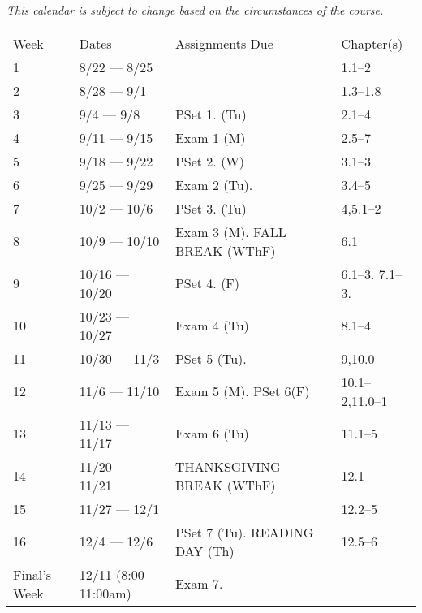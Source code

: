 \documentclass[nobib]{tufte-handout}
\begin{document}
\textit{This calendar is subject to change based on the circumstances of the course.}

\begin{center}
\begin{tabular}{llll}
\underline{Week} & \underline{Dates} & \underline{Assignments Due} & \underline{Chapter(s)}\\
1 & 8/22 --- 8/25 & & 1.1--2 \\
2 & 8/28 --- 9/1 & & 1.3--1.8 \\
3 & 9/4 --- 9/8 & PSet 1. (Tu) & 2.1--4 \\
4 & 9/11 --- 9/15 & Exam 1 (M) & 2.5--7 \\
5 & 9/18 --- 9/22 & PSet 2. (W) & 3.1--3 \\
6 & 9/25 --- 9/29 & Exam 2 (Tu). & 3.4--5 \\
7 & 10/2 --- 10/6 &  PSet 3. (Tu) & 4,5.1--2  \\
8 & 10/9 --- 10/10 & Exam 3 (M). FALL BREAK (WThF) &  6.1\\
9 & 10/16 --- 10/20 & PSet 4. (F) & 6.1--3. 7.1--3. \\
10 & 10/23 --- 10/27 & Exam 4 (Tu) & 8.1--4 \\
11 & 10/30 --- 11/3 &  PSet 5 (Tu). & 9,10.0 \\
12 & 11/6 --- 11/10 &  Exam 5 (M). PSet 6(F) & 10.1--2,11.0--1 \\
13 & 11/13 --- 11/17 & Exam 6 (Tu) & 11.1--5 \\
14 & 11/20 --- 11/21 &  THANKSGIVING BREAK (WThF) & 12.1 \\
15 & 11/27 --- 12/1 &  & 12.2--5\\
16 & 12/4 --- 12/6 & PSet 7 (Tu).  READING DAY (Th) & 12.5--6\\
Final's Week & 12/11 (8:00--11:00am) & Exam 7. &  \\
\end{tabular}
\end{center}
\end{document}
